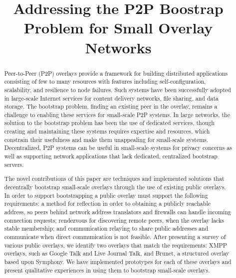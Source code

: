 \documentclass[conference]{IEEEtran}
\begin{document}
\title{Addressing the P2P Boostrap Problem for Small Overlay Networks}

\author{
}

\maketitle

\begin{abstract}

Peer-to-Peer (P2P) overlays provide a framework for building distributed
applications consisting of few to many resources with features including
self-configuration, scalability, and resilience to node failures.  Such systems
have been successfully adopted in large-scale Internet services for content
delivery networks, file sharing, and data storage.  The bootstrap problem,
finding an existing peer in the overlay, remains a challenge to enabling these
services for small-scale P2P systems.  In large networks, the solution to the
bootstrap problem has been the use of dedicated services, though creating and
maintaining these systems requires expertise and resources, which constrain
their usefulness and make them unappealing for small-scale systems.
Decentralized, P2P systems can be useful in small-scale systems for privacy
concerns as well as supporting network applications that lack dedicated,
centralized bootstrap servers.

The novel contributions of this paper are techniques and implemented solutions
that decentrally bootstrap small-scale overlays through the use of existing
public overlays.  In order to support bootstrapping a public overlay must
support the following requirements: a method for reflection in order to
obtaining a publicly reachable address, so peers behind network address
translators and firewalls can handle incoming connection requests; rendezvous
for discovering remote peers, when the overlay lacks stable membership; and
communication relaying to share public addresses and communicate when direct
communication is not feasible.  After presenting a survey of various public
overlays, we identify two overlays that match the requirements:  XMPP overlays,
such as Google Talk and Live Journal Talk, and Brunet, a structured overlay
based upon Symphony.  We have implemented prototypes for each of these overlays
and present qualitative experiences in using them to bootstrap small-scale
overlays.

\end{abstract}
\end{document}
